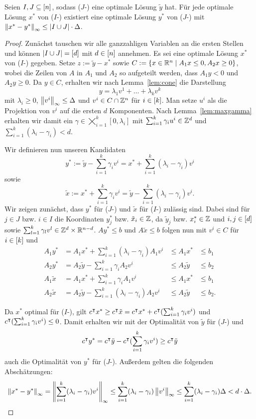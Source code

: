\begin{theorem}
	Seien $I,J\subseteq[n]$, sodass ($J$-\MIP) eine optimale Lösung $\tilde{y}$ hat.
	Für jede optimale Lösung $x^*$ von ($I$-\MIP) existiert eine optimale Lösung $y^*$ von ($J$-\MIP) mit $\left\lVert x^*-y^*\right\rVert_\infty\leq\lvert I\cup J \rvert\cdot\Delta$.
\end{theorem}
\begin{proof}
	Zunächst tauschen wir alle ganzzahligen Variablen an die ersten Stellen und können $\lvert I\cup J \rvert=[d]$ mit $d\in[n]$ annehmen.
	Es sei eine optimale Lösung $x^*$ von ($I$-\MIP) gegeben.
	Setze $z:=\tilde{y}-x^*$ sowie $C:=\{ x\in\mathbb{R}^n \mid A_1 x \leq 0, A_2x\geq0 \}$, wobei die Zeilen von $A$ in $A_1$ und $A_2$ so aufgeteilt werden, dass $A_1y<0$ und $A_2y\geq0$.
	Da $y\in C$, erhalten wir nach Lemma~\ref{lem:cone} die Darstellung 
	$$y = \lambda_1v^1 + \dots+\lambda_kv^k$$
	mit $\lambda_i\geq0$, $\left\lVert v^i\right\rVert_\infty\leq \Delta$ und $v^i\in C\cap\mathbb{Z}^n$ für $i\in[k]$.
	Man setze $u^i$ als die Projektion von $v^i$ auf die ersten $d$ Komponenten.
	Nach Lemma~\ref{lem:maxgamma} erhalten wir damit ein $\gamma\in\bigtimes_{i=1}^k[0,\lambda_i]$ mit  $\sum_{i=1}^k\gamma_iu^i\in\mathbb{Z}^d$ und $\sum_{i=1}^k(\lambda_i -\gamma_i)<d$.
	
	Wir definieren nun unseren Kandidaten $$y^*:=\tilde{y}-\sum_{i=1}^k\gamma_iv^i=x^*+\sum_{i=1}^k(\lambda_i-\gamma_i)v^i$$
	sowie $$\tilde{x}:=x^*+\sum_{i=1}^k\gamma_iv^i=\tilde{y}-\sum_{i=1}^k(\lambda_i-\gamma_i)v^i.$$
	Wir zeigen zunächst, dass $y^*$ für ($J$-\MIP) und $\tilde{x}$ für ($I$-\MIP) zulässig sind.
	Dabei sind für $j\in J$ bzw. $i\in I$ die Koordinaten $y^*_j$ bzw. $\tilde{x}_i\in\mathbb{Z}$, da $\tilde{y}_j$ bzw. $x^*_i\in\mathbb{Z}$ und $i,j\in[d]$ sowie $\sum_{l=1}^k\gamma_lv^l\in\mathbb{Z}^d\times\mathbb{R}^{n-d}$.
	$Ay^*\leq b$ und $A\tilde{x}\leq b$ folgen nun mit $v^i\in C$ für $i\in[k]$ und 
	$$
	\begin{array}{llll}
	A_1 y^* &=A_1x^*+\sum_{i=1}^k(\lambda_i-\gamma_i)A_1v^i &\leq A_1 x^* &\leq b_1\\
	A_2 y^* &=A_2\tilde{y}-\sum_{i=1}^k\gamma_iA_2v^i &\leq A_2\tilde{y} &\leq b_2\\
	A_1\tilde{x} &=A_1x^*+\sum_{i=1}^k \gamma_iA_1v^i &\leq A_1x^* &\leq b_1\\
	A_2\tilde{x} &=A_2\tilde{y}-\sum_{i=1}^k(\lambda_i-\gamma_i)A_2v^i&\leq A_2\tilde{y}&\leq b_2.
	\end{array}
	$$
	
	Da $x^*$ optimal für ($I$-\MIP), gilt $c^\intercal x^*\geq c^\intercal \tilde{x} = c^\intercal x^* + c^\intercal (\sum_{i=1}^k\gamma_iv^i)$ und  $c^\intercal(\sum_{i=1}^k\gamma_iv^i)\leq0$.
	Damit erhalten wir mit der Optimalität von $\tilde{y}$ für ($J$-\MIP) und
	$$c^\intercal y^*=c^\intercal\tilde{y}-c^\intercal(\sum_{i=1}^k\gamma_iv^i)\geq c^\intercal\tilde{y}$$
	auch die Optimalität von $y^*$ für ($J$-\MIP).
	Außerdem gelten die folgenden Abschätzungen:
	$$\left\lVert x^*-y^*\right\rVert_\infty=\left\lVert\sum_{i=1}^k(\lambda_i-\gamma_i)v^i\right\rVert_\infty\leq \sum_{i=1}^k(\lambda_i-\gamma_i)\left\lVert v^i\right\rVert_\infty\leq \sum_{i=1}^k(\lambda_i-\gamma_i)\Delta< d\cdot\Delta.
	$$
\end{proof}
